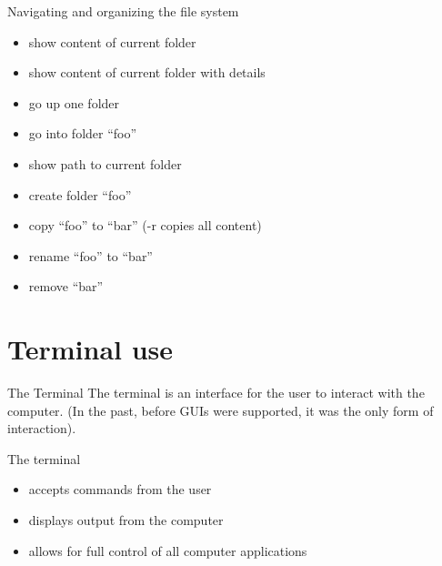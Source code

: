 \documentclass{setbeamer}
\begin{document}
\begin{frame}{Navigating and organizing the file system}
    \begin{itemize}
        \item {} show content of current folder
        \item {} show content of current folder with details
        \item {} go up one folder
        \item {} go into folder ``foo''
        \item {} show path to current folder
        \item {} create folder ``foo''
        \item {} copy ``foo'' to ``bar'' (-r copies all content)
        \item {} rename ``foo'' to ``bar''
        \item {} remove ``bar'' 
    \end{itemize}
\end{frame}



\section{Terminal use}

\begin{frame}{The Terminal}
    The terminal is an interface for the user to interact with the computer. (In the past, before GUIs were supported, it was the only form of interaction).

    \vspace{0.3cm}

    The terminal
    \begin{itemize}
        \item accepts commands from the user
        \item displays output from the computer
        \item allows for full control of all computer applications
    \end{itemize}
\end{frame}
\end{document}

